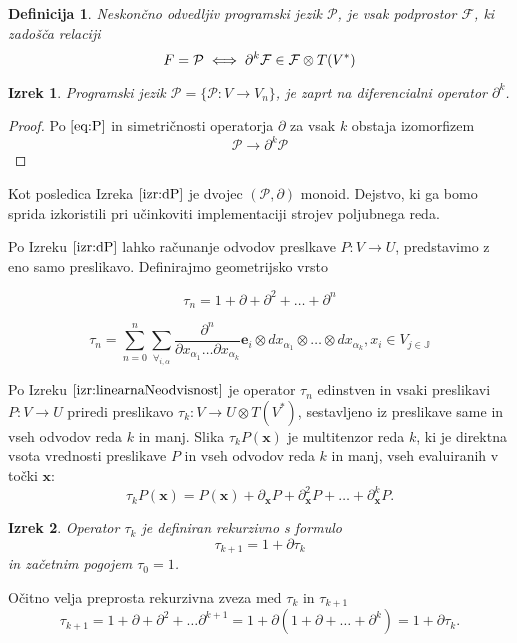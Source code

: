 \documentclass{article}
\newcommand{\JJ}{\mathbb{J}}
\newcommand{\e}{\mathbf{e}}
\newcommand{\x}{\mathbf{x}}
\newcommand{\F}{\mathcal{F}}
\newcommand{\dP}{\mathcal{P}}
\newcommand{\D}{\partial}
\newcommand{\sumd}{\tau}
\newtheorem{definicija}{Definicija}[section]
\newtheorem{izrek}{Izrek}[section]
\begin{document}
 \begin{definicija}
 	Neskončno odvedljiv programski jezik $\dP$, je vsak podprostor $\F$, ki zadošča relaciji
 	\begin{equation}\label{eq:P}
 		\\F=\dP\iff\D^k\F\in\F\otimes T(V^*)
 	\end{equation}
 \end{definicija}
 
 \begin{izrek}\label{izr:dP}
	Programski jezik $\dP=\{\dP:V\to V_n\}$, je zaprt na diferencialni operator $\D^k$.
 \end{izrek}
 
 \begin{proof}
 	 Po $\eqref{eq:P}$ in simetričnosti operatorja $\D$ za vsak $k$ obstaja izomorfizem
 	 	\begin{equation}
 	 		\dP\to\D^k\dP
 	 	\end{equation}
 \end{proof}
 
 Kot posledica Izreka $\ref{izr:dP}$ je dvojec $(\dP,\D)$ monoid. Dejstvo, ki ga bomo sprida izkoristili pri učinkoviti implementaciji strojev poljubnega reda.

Po Izreku $\ref{izr:dP}$ lahko računanje odvodov preslkave $P:V\to U$, predstavimo z eno samo
preslikavo. Definirajmo geometrijsko vrsto
 
 \begin{equation}\label{eq:DD}
  	\sumd_n = 1+\D +\D^2 +\ldots + \D^n 
  \end{equation}
  
  
  \begin{equation}
  	\sumd_n=\sum\limits_{n=0}^{n}\sum_{\forall_{i,\alpha}}\frac{\partial^n}{\partial
  		    x_{\alpha_1}\ldots \partial x_{\alpha_k}}\e_i\otimes
  		  dx_{\alpha_1}\otimes\ldots \otimes dx_{\alpha_k} , x_i\in V_{j\in\JJ}
  \end{equation}
  
  Po Izreku $\ref{izr:linearnaNeodvisnost}$ je operator $\sumd_n$ edinstven in vsaki preslikavi $P: V\to U$ priredi preslikavo $\sumd_k:V\to
U\otimes T(V^*)$, sestavljeno iz preslikave same in vseh odvodov reda $k$ in
manj. Slika $\sumd_kP(\x)$ je multitenzor reda $k$, ki je direktna vsota
vrednosti preslikave $P$ in vseh odvodov reda $k$ in manj, vseh evaluiranih v
točki $\x$:
\begin{equation}
  \label{eq:multi_odvod}
  \sumd_kP(\x) = P(\x)+\D_\x P + \D^2_\x P + \ldots + \D^k_\x P.
\end{equation}
\begin{izrek}\label{izr:tauRek}
  Operator $\sumd_k$ je definiran rekurzivno s formulo
  \begin{equation}
    \label{eq:potenca(1+d)}
    \sumd_{k+1}=1+\D\sumd_{k}
  \end{equation}
in začetnim pogojem $\tau_0=1$.
\end{izrek}
Očitno velja preprosta rekurzivna zveza med $\sumd_k$ in $\sumd_{k+1}$
\begin{equation}
   \label{eq:rekurzija}
   \sumd_{k+1} = 1 + \D +\D^2+\ldots \D^{k+1} = 1+\D(1+\D+\ldots +\D^{k}) = 1+\D\sumd_k.
\end{equation} 
\end{document}
